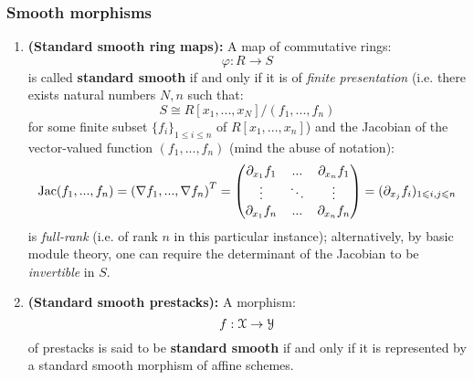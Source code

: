         \subsubsection{Smooth morphisms}
            \begin{definition} \label{def: standard_smoothness} 
                \noindent
                \begin{enumerate}
                    \item \textbf{(Standard smooth ring maps):} A map of commutative rings:
                        $$\varphi: R \to S$$
                    is called \textbf{standard smooth} if and only if it is of \textit{finite presentation} (i.e. there exists natural numbers $N, n$ such that:
                        $$S \cong R[x_1, ..., x_N]/(f_1, ..., f_n)$$
                    for some finite subset $\{f_i\}_{1 \leq i \leq n}$ of $R[x_1, ..., x_n]$) and the Jacobian of the vector-valued function $(f_1, ..., f_n)$ (mind the abuse of notation):
                        $$\mathrm{Jac}(f_1, ..., f_n) = \left(\nabla f_1, ..., \nabla f_n\right)^T = 
                            \begin{pmatrix}
                                \partial_{x_1} f_1 & ... & \partial_{x_n} f_1
                                \\
                                \vdots & \ddots & \vdots
                                \\
                                \partial_{x_1} f_n & ... & \partial_{x_n} f_n
                            \end{pmatrix}
                        = (\partial_{x_j} f_i)_{1 \leqslant i, j \leqslant n}$$
                    is \textit{full-rank} (i.e. of rank $n$ in this particular instance); alternatively, by basic module theory, one can require the determinant of the Jacobian to be \textit{invertible} in $S$.  
                    \item \textbf{(Standard smooth prestacks):} A morphism:
                        $$f: \mathcal{X} \to \mathcal{Y}$$
                    of prestacks is said to be \textbf{standard smooth} if and only if it is represented by a standard smooth morphism of affine schemes.
                \end{enumerate}
            \end{definition}
